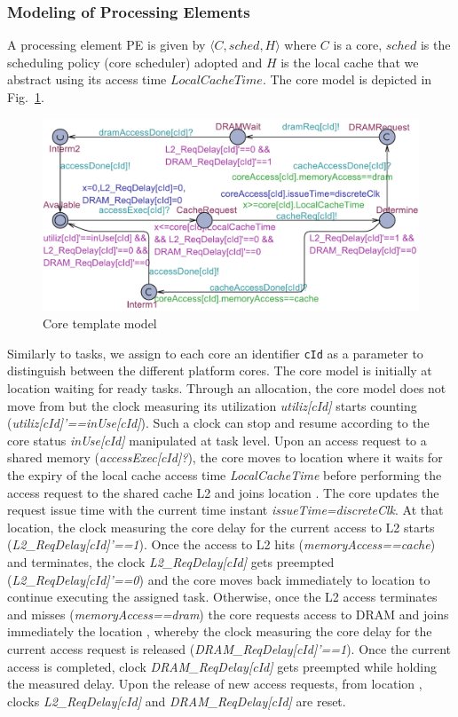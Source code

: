 \subsubsection{Modeling of Processing Elements}
A processing element PE is given by $\langle C, sched, H\rangle$ where $C$ is a core, $sched$ is the scheduling policy (core scheduler) adopted and $H$ is the local cache that we abstract using its access time $LocalCacheTime$. The core model is depicted in Fig.~\ref{fig:core}.  

\begin{figure}
\centering
\caption{Core template model}
\label{fig:core}
\includegraphics[scale=0.41]{Core.pdf}
\vspace{-3mm}
\end{figure}

Similarly to tasks, we assign to each core an identifier \texttt{cId} as a parameter to distinguish between the different platform cores. The core model is initially at location  waiting for ready tasks. Through an allocation, the core model does not move from  but the clock measuring its utilization \emph{utiliz[cId]} starts counting (\emph{utiliz[cId]'==inUse[cId]}). Such a clock can stop and resume according to the core status \emph{inUse[cId]} manipulated at task level. Upon an access request to a shared memory (\emph{accessExec[cId]?}), the core moves to location  where it waits for the expiry of the local cache access time \emph{LocalCacheTime} before performing the access request to the shared cache L2 and joins location . The core updates the request issue time with the current time instant \emph{issueTime=discreteClk}. At that location, the clock measuring the core delay for the current access to L2 starts (\emph{L2\_ReqDelay[cId]'==1}). 
Once the access to L2 hits (\emph{memoryAccess==cache}) and terminates, the clock \emph{L2\_ReqDelay[cId]} gets preempted (\emph{L2\_ReqDelay[cId]'==0}) and the core moves back immediately to location  to continue executing the assigned task. Otherwise, once the L2 access terminates and misses (\emph{memoryAccess==dram}) the core requests access to DRAM and joins immediately the location , whereby the clock measuring the core delay for the current access request is released (\emph{DRAM\_ReqDelay[cId]'==1}). Once the current access is completed, clock \emph{DRAM\_ReqDelay[cId]} gets preempted while holding the measured delay. Upon the release of new access requests, from location , clocks \emph{L2\_ReqDelay[cId]} and \emph{DRAM\_ReqDelay[cId]} are reset. 
  
